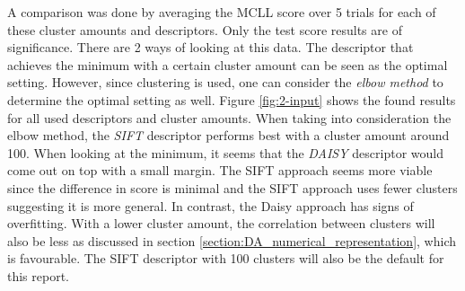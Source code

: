 A comparison was done by averaging the MCLL score over 5 trials for each of these cluster amounts and descriptors.
Only the test score results are of significance.
There are 2 ways of looking at this data.
The descriptor that achieves the minimum with a certain cluster amount can be seen as the optimal setting.
However, since clustering is used, one can consider the \emph{elbow method} to determine the optimal setting as well.
Figure \ref{fig:2-input} shows the found results for all used descriptors and cluster amounts.
When taking into consideration the elbow method, the \emph{SIFT} descriptor performs best with a cluster amount around 100.
When looking at the minimum, it seems that the \emph{DAISY} descriptor would come out on top with a small margin.
The SIFT approach seems more viable since the difference in score is minimal and the SIFT approach uses fewer clusters suggesting it is more general.
In contrast, the Daisy approach has signs of overfitting.
With a lower cluster amount, the correlation between clusters will also be less as discussed in section \ref{section:DA_numerical_representation}, which is favourable.
The SIFT descriptor with 100 clusters will also be the default for this report.

